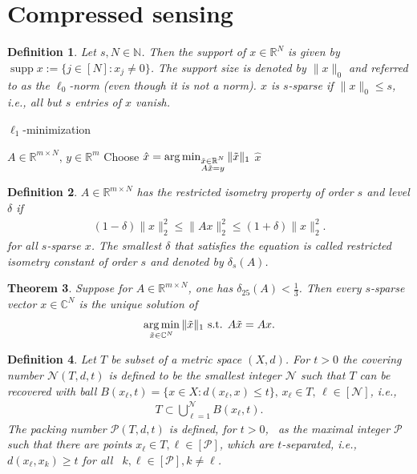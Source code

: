 \documentclass[13pt]{article}
\newtheorem{thm}{Theorem}[section]
\theoremstyle{plain}
\newtheorem{defi}[thm]{Definition}
\newcommand{\R}{\mathbb{R}}
\newcommand{\C}{\mathbb{C}}
\newcommand{\N}{\mathbb{N}}
\newcommand{\NN}{\mathcal{N}}
\newcommand{\PP}{\mathcal{P}}
\newcommand{\set}[1]{{\{#1\}}}
\DeclareMathOperator{\argmin}{\arg\min}
\DeclareMathOperator{\supp}{supp}
\newcommand{\til}{\ensuremath{\tilde}}
\begin{document}
\newpage

\section{Compressed sensing}

\begin{defi}
    Let $s, N \in \N$. Then the \emph{support} of $x \in \R^N$ is given by
    $\supp x := \set{j \in [N] : x_j \ne 0}$. The support size is
    denoted by $\|x\|_0$ and referred to as the \emph{$\ell_0$-norm} (even though it is not a norm).
    $x$ is $s$-sparse if $\|x\|_0 \le s$, i.e., all but $s$ entries of $x$ vanish.
\end{defi}

\begin{algorithm}
\caption{$\ell_1$-minimization}\label{alg:l1_min}
\begin{algorithmic}
    \Require $A \in \R^{m \times N},\, y \in \R^{m}$
    \State Choose $\hat{x} = \argmin_{\substack{\til{x} \in \R^N\\ A\til{x} = y}} \|\til{x}\|_1$  
    \State \Return $\hat{x}$
\end{algorithmic}
\end{algorithm}

\begin{defi}
    $A \in \R^{m \times N}$ has the \emph{restricted isometry property} of order $s$
    and level $\delta$ if
    \[
        \begin{aligned}
            (1-\delta)\|x\|_2^2 \le \|Ax\|_2^2 \le (1+\delta)\|x\|_2^2.
        \end{aligned}
    \] for all $s$-sparse $x$. The smallest $\delta$ that satisfies the equation
    is called \emph{restricted isometry constant} of order $s$ and denoted by $\delta_s(A)$.
\end{defi}

\begin{thm}
    Suppose for $A \in \R^{m \times N}$, one has $\delta_{25}(A) < \frac{1}{3}$.
    Then every $s$-sparse vector $x \in \C^N$ is the unique solution of
    \[
        \begin{aligned}
            \argmin\limits_{\til{x} \in \C^N} \|\til{x}\|_1 \text{ s.t. } A\til{x} = Ax.
        \end{aligned}
    \]
\end{thm}

\begin{defi}
    Let $T$ be subset of a metric space $(X,d)$. For $t > 0$ the \emph{covering number}
    $\NN(T,d,t)$ is defined to be the smallest integer $\NN$ such that
    $T$ can be recovered with ball $B(x_{\ell},t) = \set{x \in X : d(x_\ell,x) \le t},\,\allowbreak x_\ell \in T,\, \ell \in [\NN]$, i.e.,
    \[
        \begin{aligned}
            T \subset \bigcup_{\ell = 1}^\NN B(x_\ell,t).
        \end{aligned}
    \]
    The \emph{packing number} $\PP(T,d,t)$ is defined, for $t > 0$,  as the maximal integer $\PP$
    such that there are points $x_\ell \in T, \ell \in [\PP]$, which are $t$-separated, i.e.,
    $d(x_\ell,x_k) \ge t$ for all  $k,\ell \in [\PP], k \ne \ell$.
\end{defi}
\end{document}
